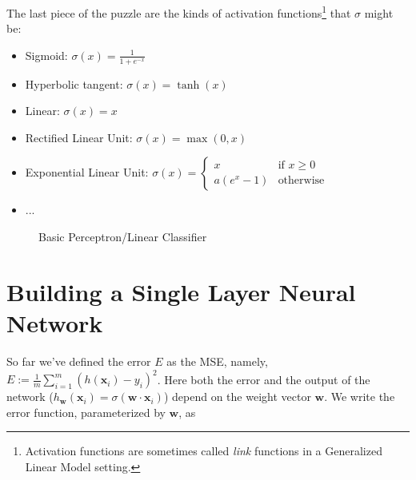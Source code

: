 \documentclass[11pt, oneside]{article}   	%
\begin{document}
\bigskip
\noindent
The last piece of the puzzle are the kinds of activation functions\footnote{Activation functions are sometimes called \emph{link} functions in a Generalized Linear Model setting.} that $\sigma$ might be:
\begin{itemize}
\item Sigmoid: $\sigma(x) = \frac{1}{1+e^{-x}}$
\item Hyperbolic tangent: $\sigma(x) = \tanh(x)$
\item Linear: $\sigma(x) = x$
\item  Rectified Linear Unit: $\sigma(x) = \max(0,x)$
\item  Exponential Linear Unit: 
$\sigma(x) =\left \{ 
        \begin{array}{ll}
		x   & \text{if } x \ge 0 \\
		a(e^x - 1)     & \text{otherwise }
	\end{array}
\right. $
\item ...
\end{itemize}

\begin{figure}
\caption{Basic Perceptron/Linear Classifier}
\label{fig:perceptron}
\end{figure}

\section{Building a Single Layer Neural Network}
\noindent
So far we've defined the error $E$ as the MSE, namely, $E := \frac{1}{m} \sum\limits_{i = 1}^{m} (h(\mathbf{x}_i) - y_i)^2$. Here both the error and the output of the network 
($h_{\mathbf{w}}(\mathbf{x}_i) = \sigma(\mathbf{w} \cdot \mathbf{x}_i)$) depend on the weight vector $\mathbf{w}$. We write the error function, parameterized by $\mathbf{w}$, as
\end{document}

